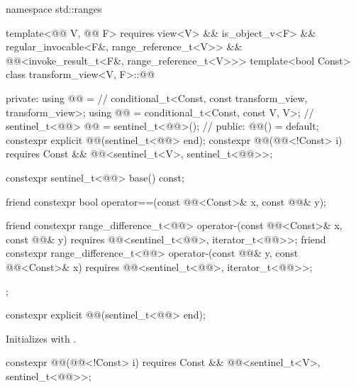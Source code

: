 %
\begin{codeblock}
namespace std::ranges {
  template<@@ V, @@ F>
    requires view<V> && is_object_v<F> &&
             regular_invocable<F&, range_reference_t<V>> &&
             @@<invoke_result_t<F&, range_reference_t<V>>>
  template<bool Const>
  class transform_view<V, F>::@@ {
  private:
    using @@ =                                      // \expos
      conditional_t<Const, const transform_view, transform_view>;
    using @@ = conditional_t<Const, const V, V>;      // \expos
    sentinel_t<@@> @@ = sentinel_t<@@>();         // \expos
  public:
    @@() = default;
    constexpr explicit @@(sentinel_t<@@> end);
    constexpr @@(@@<!Const> i)
      requires Const && @@<sentinel_t<V>, sentinel_t<@@>>;

    constexpr sentinel_t<@@> base() const;

    friend constexpr bool operator==(const @@<Const>& x, const @@& y);

    friend constexpr range_difference_t<@@>
      operator-(const @@<Const>& x, const @@& y)
        requires @@<sentinel_t<@@>, iterator_t<@@>>;
    friend constexpr range_difference_t<@@>
      operator-(const @@& y, const @@<Const>& x)
        requires @@<sentinel_t<@@>, iterator_t<@@>>;
  };
}
\end{codeblock}

%
\begin{itemdecl}
constexpr explicit @@(sentinel_t<@@> end);
\end{itemdecl}

\begin{itemdescr}
\pnum
\effects
Initializes  with .
\end{itemdescr}

%
\begin{itemdecl}
constexpr @@(@@<!Const> i)
  requires Const && @@<sentinel_t<V>, sentinel_t<@@>>;
\end{itemdecl}

